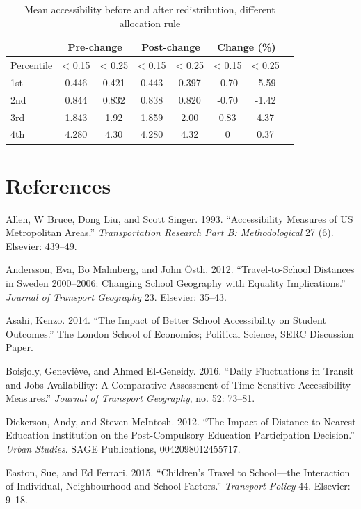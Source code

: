 \documentclass[3p,authoryear,preprint,review,12pt]{elsarticle}
\begin{document}
\begin{table}[H]\caption{Mean accessibility before and after
redistribution, different allocation rule}\label{sen2}
\begin{tabular}[c]{lccccccc}\hline
 & \multicolumn{2}{c}{Pre-change} & \multicolumn{2}{c}{Post-change} & \multicolumn{2}{c}{ Change (\%)} \\ \hline
Percentile & < 0.15  & < 0.25 &  < 0.15  & < 0.25 & < 0.15  & < 0.25 \\ \hline 
1st & 0.446 & 0.421 &  0.443 & 0.397 & -0.70 & -5.59 \tabularnewline
2nd & 0.844 & 0.832 &  0.838 & 0.820 & -0.70 & -1.42 \tabularnewline
3rd & 1.843 & 1.92 &  1.859 & 2.00 & 0.83 & 4.37 \tabularnewline
4th & 4.280 & 4.30 &  4.280 & 4.32 & 0 & 0.37 \tabularnewline
\bottomrule
\end{tabular}
\end{table}

\section{References}\label{references}

Allen, W Bruce, Dong Liu, and Scott Singer. 1993. ``Accessibility
Measures of US Metropolitan Areas.'' \emph{Transportation Research Part
B: Methodological} 27 (6). Elsevier: 439--49.

Andersson, Eva, Bo Malmberg, and John {Ö}sth. 2012. ``Travel-to-School
Distances in Sweden 2000--2006: Changing School Geography with Equality
Implications.'' \emph{Journal of Transport Geography} 23. Elsevier:
35--43.

Asahi, Kenzo. 2014. ``The Impact of Better School Accessibility on
Student Outcomes.'' The London School of Economics; Political Science,
SERC Discussion Paper.

Boisjoly, Genevi{è}ve, and Ahmed El-Geneidy. 2016. ``Daily Fluctuations
in Transit and Jobs Availability: A Comparative Assessment of
Time-Sensitive Accessibility Measures.'' \emph{Journal of Transport
Geography}, no. 52: 73--81.

Dickerson, Andy, and Steven McIntosh. 2012. ``The Impact of Distance to
Nearest Education Institution on the Post-Compulsory Education
Participation Decision.'' \emph{Urban Studies}. SAGE Publications,
0042098012455717.

Easton, Sue, and Ed Ferrari. 2015. ``Children's Travel to School---the
Interaction of Individual, Neighbourhood and School Factors.''
\emph{Transport Policy} 44. Elsevier: 9--18.
\end{document}
